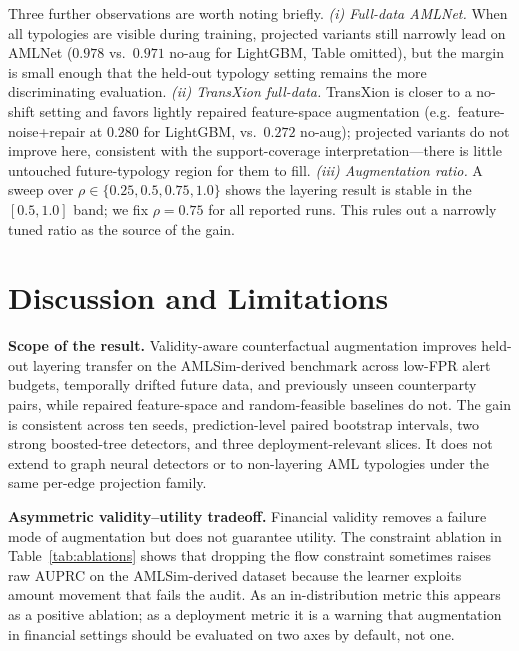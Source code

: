 \documentclass[sigconf,review,anonymous]{acmart}
\begin{document}
Three further observations are worth noting briefly. \emph{(i) Full-data
AMLNet.} When all typologies are visible during training, projected variants
still narrowly lead on AMLNet ($0.978$ vs.\ $0.971$ no-aug for LightGBM,
Table omitted), but the margin is small enough that the held-out typology
setting remains the more discriminating evaluation.
\emph{(ii) TransXion full-data.} TransXion is closer to a no-shift setting and
favors lightly repaired feature-space augmentation (e.g.\ feature-noise+repair
at $0.280$ for LightGBM, vs.\ $0.272$ no-aug); projected variants do not
improve here, consistent with the support-coverage interpretation---there
is little untouched future-typology region for them to fill.
\emph{(iii) Augmentation ratio.} A sweep over $\rho\in\{0.25,0.5,0.75,1.0\}$
shows the layering result is stable in the $[0.5,1.0]$ band; we fix
$\rho{=}0.75$ for all reported runs. This rules out a narrowly tuned ratio
as the source of the gain.

\FloatBarrier

\section{Discussion and Limitations}
\label{sec:discussion}

\textbf{Scope of the result.}
Validity-aware counterfactual augmentation improves held-out layering
transfer on the AMLSim-derived benchmark across low-FPR alert budgets,
temporally drifted future data, and previously unseen counterparty pairs,
while repaired feature-space and random-feasible baselines do not. The gain
is consistent across ten seeds, prediction-level paired bootstrap intervals,
two strong boosted-tree detectors, and three deployment-relevant slices. It
does not extend to graph neural detectors or to non-layering AML typologies
under the same per-edge projection family.

\textbf{Asymmetric validity--utility tradeoff.}
Financial validity removes a failure mode of augmentation but does not
guarantee utility. The constraint ablation in
Table~\ref{tab:ablations} shows that dropping the flow constraint sometimes
raises raw AUPRC on the AMLSim-derived dataset because the learner exploits
amount movement that fails the audit. As an in-distribution metric this
appears as a positive ablation; as a deployment metric it is a warning that
augmentation in financial settings should be evaluated on two axes by
default, not one.
\end{document}
